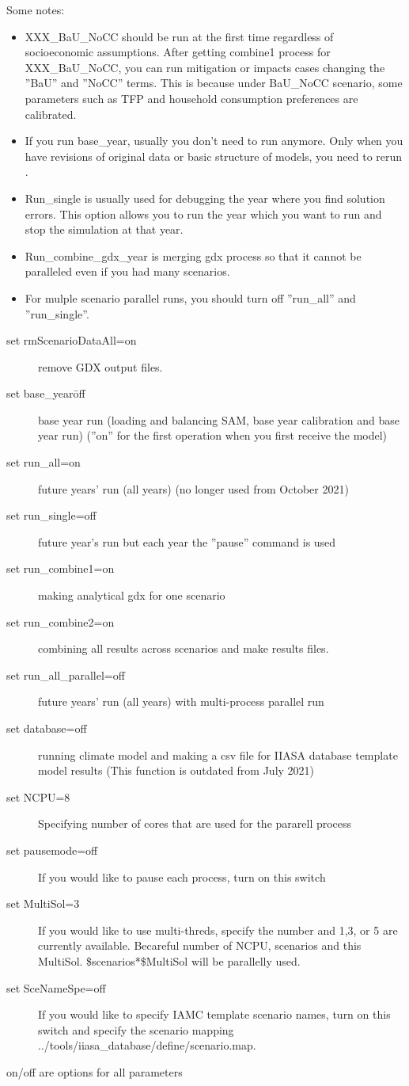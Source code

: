 \documentclass[10pt,a4paper,titlepage,dvipdfmx]{book}
\begin{document}
Some notes:
\begin{itemize}
\item XXX\_BaU\_NoCC should be run at the first time regardless of socioeconomic assumptions. After getting combine1 process for XXX\_BaU\_NoCC, you can run mitigation or impacts cases changing the ''BaU'' and ''NoCC'' terms. This is because under BaU\_NoCC scenario, some parameters such as TFP and household consumption preferences are calibrated.
\item If you run base\_year, usually you don't need to run anymore. Only when you have revisions of original data or basic structure of models, you need to rerun .
\item Run\_single is usually used for debugging the year where you find solution errors. This option allows you to run the year which you want to run and stop the simulation at that year.
\item Run\_combine\_gdx\_year is merging gdx process so that it cannot be paralleled even if you had many scenarios.
\item For mulple scenario parallel runs, you should turn off ''run\_all'' and ''run\_single''.
\end{itemize}

\begin{description}
\item[set rmScenarioDataAll=on] remove GDX output files.
\item[set base\_year\=off] base year run (loading and balancing SAM, base year calibration and base year run) (''on'' for the first operation when you first receive the model)
\item[set run\_all=on]future years' run (all years) (no longer used from October 2021)
\item[set run\_single=off]future year's run but each year the ''pause'' command is used
\item[set run\_combine1=on]making analytical gdx for one scenario
\item[set run\_combine2=on]combining all results across scenarios and make results files.
\item[set run\_all\_parallel=off]future years' run (all years) with multi-process parallel run
\item[set database=off]running climate model and making a csv file for IIASA database template model results (This function is outdated from July 2021)
\item[set NCPU=8]Specifying number of cores that are used for the pararell process
\item[set pausemode=off]If you would like to pause each process, turn on this switch
\item[set MultiSol=3]If you would like to use multi-threds, specify the number and 1,3, or 5 are currently available. Becareful number of NCPU, scenarios and this MultiSol. \$scenarios*\$MultiSol will be parallelly used. 
\item[set SceNameSpe=off]If you would like to specify IAMC template scenario names, turn on this switch and specify the scenario mapping ../tools/iiasa\_database/define/scenario.map. 
\end{description}
on/off are options for all parameters
\end{document}
